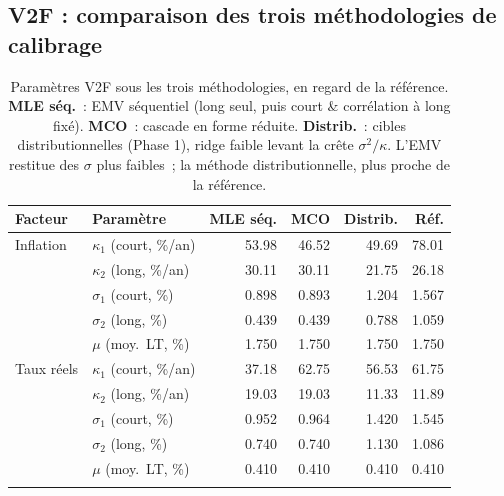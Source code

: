 \documentclass[11pt,a4paper]{article}
\theoremstyle{definition}
\begin{document}
\subsection{V2F : comparaison des trois méthodologies de calibrage}
\begin{table}[H]\centering\small\renewcommand{\arraystretch}{1.2}\setlength{\tabcolsep}{6pt}
\begin{tabularx}{\textwidth}{@{}l X r r r r@{}}
\toprule
\textbf{Facteur} & \textbf{Paramètre} & \textbf{MLE séq.} & \textbf{MCO} & \textbf{Distrib.} & \textbf{Réf.}\\
\midrule
Inflation & $\kappa_1$ (court, \%/an) & 53.98 & 46.52 & 49.69 & 78.01\\
 & $\kappa_2$ (long, \%/an) & 30.11 & 30.11 & 21.75 & 26.18\\
 & $\sigma_1$ (court, \%) & 0.898 & 0.893 & 1.204 & 1.567\\
 & $\sigma_2$ (long, \%) & 0.439 & 0.439 & 0.788 & 1.059\\
 & $\mu$ (moy.\ LT, \%) & 1.750 & 1.750 & 1.750 & 1.750\\
\addlinespace
Taux réels & $\kappa_1$ (court, \%/an) & 37.18 & 62.75 & 56.53 & 61.75\\
 & $\kappa_2$ (long, \%/an) & 19.03 & 19.03 & 11.33 & 11.89\\
 & $\sigma_1$ (court, \%) & 0.952 & 0.964 & 1.420 & 1.545\\
 & $\sigma_2$ (long, \%) & 0.740 & 0.740 & 1.130 & 1.086\\
 & $\mu$ (moy.\ LT, \%) & 0.410 & 0.410 & 0.410 & 0.410\\
\addlinespace
\bottomrule\end{tabularx}
\caption{Paramètres V2F sous les trois méthodologies, en regard de la référence. \textbf{MLE séq.}~: EMV séquentiel (long seul, puis court \& corrélation à long fixé). \textbf{MCO}~: cascade en forme réduite. \textbf{Distrib.}~: cibles distributionnelles (Phase 1), ridge faible levant la crête $\sigma^2/\kappa$. L'EMV restitue des $\sigma$ plus faibles~; la méthode distributionnelle, plus proche de la référence.}\label{tab:res-v2f-meth}
\end{table}
\end{document}
